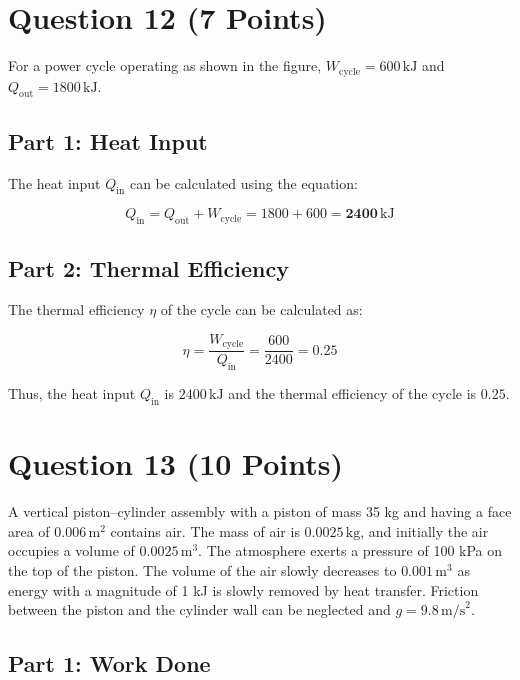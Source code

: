 \documentclass{article}
\begin{document}
\newpage
\section*{Question 12 (7 Points)}

For a power cycle operating as shown in the figure, \( W_{\text{cycle}} = 600 \, \text{kJ} \) and \( Q_{\text{out}} = 1800 \, \text{kJ} \).

\subsection*{Part 1: Heat Input}

The heat input \( Q_{\text{in}} \) can be calculated using the equation:

\[
Q_{\text{in}} = Q_{\text{out}} + W_{\text{cycle}} = 1800 + 600 = \mathbf{2400} \, \text{kJ}
\]

\subsection*{Part 2: Thermal Efficiency}

The thermal efficiency \( \eta \) of the cycle can be calculated as:

\[
\eta = \frac{W_{\text{cycle}}}{Q_{\text{in}}} = \frac{600}{2400} = \mathbf{0.25}
\]

Thus, the heat input \( Q_{\text{in}} \) is \( 2400 \, \text{kJ} \) and the thermal efficiency of the cycle is \( 0.25 \).

\newpage
\section*{Question 13 (10 Points)}

A vertical piston–cylinder assembly with a piston of mass 35 kg and having a face area of \(0.006 \, \text{m}^2\) contains air. The mass of air is \(0.0025 \, \text{kg}\), and initially the air occupies a volume of \(0.0025 \, \text{m}^3\). The atmosphere exerts a pressure of 100 kPa on the top of the piston. The volume of the air slowly decreases to \(0.001 \, \text{m}^3\) as energy with a magnitude of 1 kJ is slowly removed by heat transfer. Friction between the piston and the cylinder wall can be neglected and \(g = 9.8 \, \text{m/s}^2\).

\subsection*{Part 1: Work Done}
\end{document}
